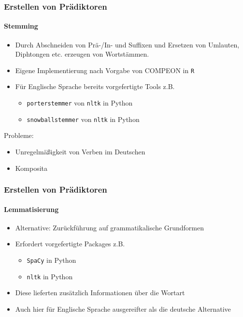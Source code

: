 \documentclass{beamer}
\begin{document}
\begin{frame}
\frametitle{Erstellen von Prädiktoren}
\framesubtitle{Stemming}
\begin{itemize}\itemsep12pt
\item Durch Abschneiden von Prä-/In- und Suffixen und Ersetzen von Umlauten, Diphtongen etc. erzeugen von Wortstämmen.
\item Eigene Implementierung nach Vorgabe von COMPEON in \texttt{R}
\item Für Englische Sprache bereits vorgefertigte Tools z.B. 
\begin{itemize}
\item \texttt{porterstemmer} von \texttt{nltk} in Python
\item \texttt{snowballstemmer} von \texttt{nltk} in Python
\end{itemize}
\end{itemize}
Probleme:
\begin{itemize}
\item Unregelmäßigkeit von Verben im Deutschen
\item Komposita
\end{itemize} 
\end{frame}

\begin{frame}
\frametitle{Erstellen von Prädiktoren}
\framesubtitle{Lemmatisierung}
\begin{itemize}\itemsep12pt
\item Alternative: Zurückführung auf grammatikalische Grundformen
\item Erfordert vorgefertigte Packages z.B.
\begin{itemize}
\item \texttt{SpaCy} in Python
\item \texttt{nltk} in Python
\end{itemize}
\item Diese lieferten zusätzlich Informationen über die Wortart
\item Auch hier für Englische Sprache ausgereifter als die deutsche Alternative
\end{itemize}
\end{frame}
\end{document}
